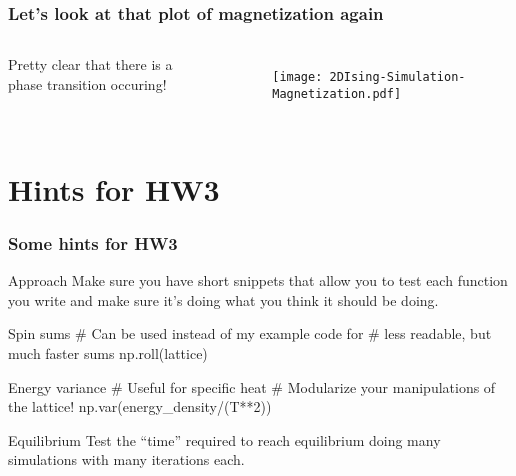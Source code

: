 \documentclass[hyperref={colorlinks=true}]{beamer}
\begin{document}

\begin{frame}%
  \frametitle{Let's look at that plot of magnetization again}

  \begin{columns}
  
 
  Pretty clear that there is a phase transition occuring!
  
  \vspace{0.5cm}
  
  
  \begin{figure}
    \texttt{[image: 2DIsing-Simulation-Magnetization.pdf]}
  \end{figure}
  \end{columns}

  
\end{frame}

\section[Hints for HW3]{Hints for HW3}

\begin{frame}[fragile,shrink=15]
  \frametitle{Some hints for HW3}
  
  \vspace{0.3cm}
  
  \begin{ucblock}{Approach}
    Make sure you have short snippets that allow you to test each function you write and make sure it's doing what you think it should be doing. 
  \end{ucblock}
  
  \begin{ucpythonblock}{Spin sums}
     # Can be used instead of my example code for 
     # less readable, but much faster sums
     np.roll(lattice) 
  \end{ucpythonblock}
  
  \begin{ucpythonblock}{Energy variance}
     # Useful for specific heat 
     # Modularize your manipulations of the lattice!
     np.var(energy_density/(T**2))
  \end{ucpythonblock}
  
  \begin{ucblock}{Equilibrium}
    Test the ``time'' required to reach equilibrium  doing many simulations with many iterations each.
  \end{ucblock}
  
\end{frame}
\end{document}
